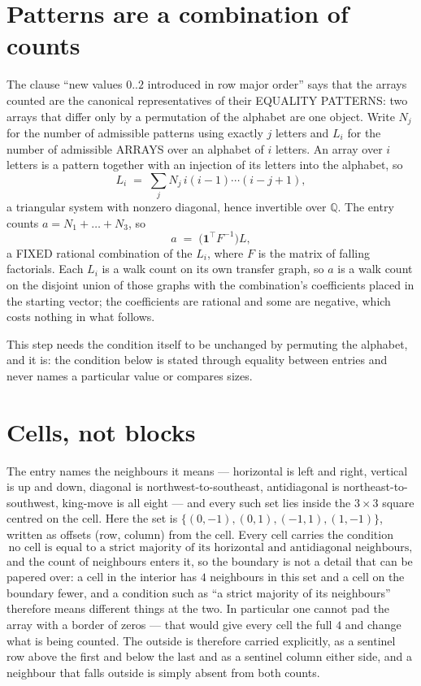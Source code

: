 \documentclass[11pt,a4paper]{article}
\theoremstyle{plain}
\theoremstyle{definition}
\begin{document}
\section{Patterns are a combination of counts}

The clause ``new values $0..2$ introduced in row major order'' says that the arrays
counted are the canonical representatives of their EQUALITY PATTERNS: two arrays that differ
only by a permutation of the alphabet are one object. Write $N_j$ for the number of admissible
patterns using exactly $j$ letters and $L_i$ for the number of admissible ARRAYS over an
alphabet of $i$ letters. An array over $i$ letters is a pattern together with an injection of
its letters into the alphabet, so
\[
L_i\;=\;\sum_{j}N_j\,i(i-1)\cdots(i-j+1),
\]
a triangular system with nonzero diagonal, hence invertible over $\mathbb{Q}$. The entry
counts $a=N_1+\dots+N_{3}$, so
\[
a\;=\;\bigl(\mathbf{1}^{\!\top}F^{-1}\bigr)L ,
\]
a FIXED rational combination of the $L_i$, where $F$ is the matrix of falling factorials.
Each $L_i$ is a walk count on its own transfer graph, so $a$ is a walk count on the disjoint
union of those graphs with the combination's coefficients placed in the starting vector; the
coefficients are rational and some are negative, which costs nothing in what follows.

This step needs the condition itself to be unchanged by permuting the alphabet, and it is:
the condition below is stated through equality between entries and never names a particular
value or compares sizes.

\section{Cells, not blocks}

The entry names the neighbours it means --- horizontal is left and right, vertical is up and
down, diagonal is northwest-to-southeast, antidiagonal is northeast-to-southwest, king-move is
all eight --- and every such set lies inside the $3\times3$ square centred on the cell. Here
the set is $\{(0,-1), (0,1), (-1,1), (1,-1)\}$, written as offsets (row, column) from the cell. Every cell carries
the condition
\[
\text{no cell is equal to a strict majority of its horizontal and antidiagonal neighbours},
\]
and the count of neighbours enters it, so the boundary is not a detail that can be papered
over: a cell in the interior has $4$ neighbours in this set and a cell on the boundary
fewer, and a condition such as ``a strict majority of its neighbours'' therefore means
different things at the two. In particular one cannot pad the array with a border of zeros ---
that would give every cell the full $4$ and change what is being counted. The outside is
therefore carried
explicitly, as a sentinel row above the first and below the last and as a sentinel column
either side, and a neighbour that falls outside is simply absent from both counts.
\end{document}
